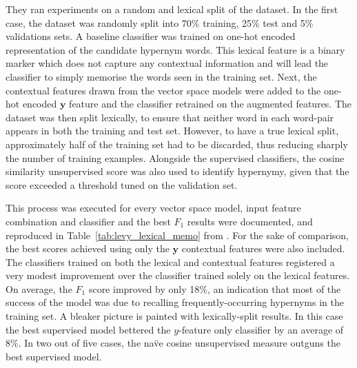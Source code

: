 They ran experiments on a random and lexical split of the dataset.  In the first case, the dataset was randomly split into 70\% training, 25\% test and 5\% validations sets.  A baseline classifier was trained on one-hot encoded representation of the candidate hypernym words.  This lexical feature is a binary marker which does not capture any contextual information and will lead the classifier to simply memorise the words seen in the training set.   Next, the contextual features drawn from the vector space models were added to the one-hot encoded $\bm{y}$ feature and the classifier retrained on the augmented features.  The dataset was then split lexically, to ensure that neither word in each word-pair appears in both the training and test set.  However, to have a true lexical split, approximately half of the training set had to be discarded, thus reducing sharply the number of training examples.  Alongside the supervised classifiers, the cosine similarity unsupervised score was also used to identify hypernymy, given that the score exceeded a threshold tuned on the validation set.

This process was executed for every vector space model, input feature combination and classifier and the best $F_1$ results were documented, and reproduced in Table~\ref{tab:levy_lexical_memo} from \citet{levy2015supervised}.  For the sake of comparison, the best scores achieved using only the $\bm{y}$ contextual features were also included.  The classifiers trained on both the  lexical and contextual features registered a very modest improvement over the classifier trained solely on the lexical features.  On average, the $F_1$ score improved by only 18\%, an indication that most of the success of the model was due to recalling frequently-occurring hypernyms in the training set.  A bleaker picture is painted with lexically-split results.  In this case the best supervised model bettered the $y$-feature only classifier by an average of 8\%.  In two out of five cases, the na\"ve cosine unsupervised measure outguns the best supervised model.  

